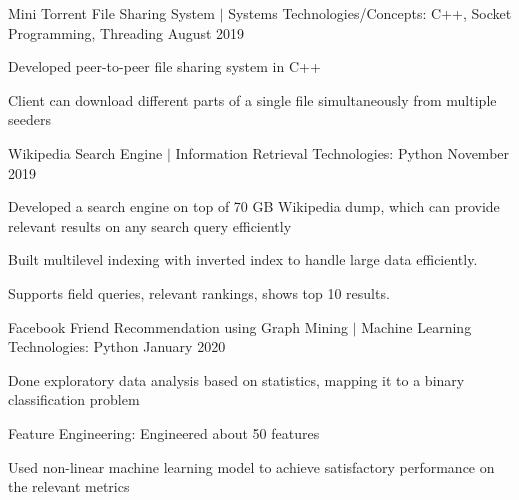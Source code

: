 







\begin{cventries}

  \cventry
    {Mini Torrent File Sharing System $|$ Systems} %
    {Technologies/Concepts: C++, Socket Programming, Threading} %
    {August 2019} %
    {} %
    {
      \begin{cvitems} %
        \item {Developed peer-to-peer file sharing system in C++}
        \item {Client can download different parts of a single file simultaneously from multiple seeders}
      \end{cvitems}
    }
    
    \cventry
    {Wikipedia Search Engine $|$ Information Retrieval} %
    {Technologies: Python} %
    {November 2019} %
    {} %
    {
      \begin{cvitems} %
        \item {Developed a search engine on top of 70 GB Wikipedia dump, which can provide relevant results on any search query efficiently}
        \item {Built multilevel indexing with inverted index to handle large data efficiently.}
        \item {Supports field queries, relevant rankings, shows top 10 results.}
      \end{cvitems}
    }
    
    \cventry
    {Facebook Friend Recommendation using Graph Mining $|$ Machine Learning} %
    { Technologies: Python} %
    {January 2020} %
    {} %
    {
      \begin{cvitems} %
        \item {Done exploratory data analysis based on statistics, mapping it to a binary classification problem}
        \item {Feature Engineering: Engineered about 50 features}
        \item {Used non-linear machine learning model to achieve satisfactory performance on the relevant metrics}
      \end{cvitems}
    }
    

\end{cventries}
